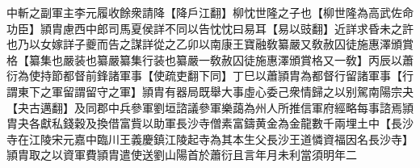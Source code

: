 中斬之副軍主李元履收餘衆請降【降戶江翻】柳忱世隆之子也【柳世隆為高武佐命功臣】頴胄慮西中郎司馬夏侯詳不同以告忱忱曰易耳【易以豉翻】近詳求昏未之許也乃以女嫁詳子夔而告之謀詳從之乙卯以南康王寶融敎纂嚴又敎赦囚徒施惠澤頒賞格【纂集也嚴装也纂嚴纂集行装也纂嚴一敎赦囚徒施惠澤頒賞格又一敎】丙辰以蕭衍為使持節都督前鋒諸軍事【使疏吏翻下同】丁巳以蕭頴胄為都督行留諸軍事【行謂東下之軍留謂留守之軍】頴胄有器局既舉大事虛心委己衆情歸之以别駕南陽宗夬【夬古邁翻】及同郡中兵參軍劉垣諮議參軍樂藹為州人所推信軍府經略每事諮焉頴胄夬各獻私錢穀及換借富貲以助軍長沙寺僧素富鑄黄金為金龍數千兩埋土中【長沙寺在江陵宋元嘉中臨川王義慶鎮江陵起寺為其本生父長沙王道憐資福因名長沙寺】頴胄取之以資軍費頴胄遣使送劉山陽首於蕭衍且言年月未利當須明年二